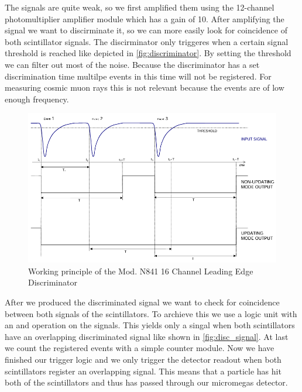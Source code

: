 \documentclass[sn-mathphys-num,iicol]{sn-jnl}
\theoremstyle{thmstyleone}
\theoremstyle{thmstyletwo}
\theoremstyle{thmstylethree}
\begin{document}
The signals are quite weak, so we first amplified them using the 12-channel photomultiplier amplifier module which has a gain of 10.
After amplifying the signal we want to discirminate it, so we can more easily look for coincidence of both scintillator signals.
The discirminator only triggeres when a certain signal threshold is reached like depicted in \autoref{fig:discriminator}. By setting the threshold we can filter out most of the noise.
Because the discriminator has a set discrimination time multilpe events in this time will not be registered. 
For measuring cosmic muon rays this is not relevant because the events are of low enough frequency.

\begin{figure}
  \includegraphics[width=\linewidth]{figures/discriminator.png}
  \caption{Working principle of the Mod. N841 16 Channel Leading Edge Discriminator}
  \label{fig:discriminator}
\end{figure}

After we produced the discriminated signal we want to check for coincidence between both signals of the scintillators.
To archieve this we use a logic unit with an and operation on the signals.
This yields only a singal when both scintillators have an overlapping discriminated signal like shown in \autoref{fig:disc_signal}. 
At last we count the registered events with a simple counter module.
Now we have finished our trigger logic and we only trigger the detector readout when both scintillators register an overlapping signal.
This means that a particle has hit both of the scintillators and thus has passed through our micromegas detector.
\end{document}
